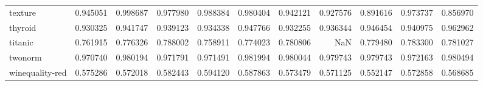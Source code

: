 \begin{tabular}{lrrrrrrrrrr}
texture         &   0.945051 &  0.998687 &  0.977980 &  0.988384 &  0.980404 &  0.942121 &  0.927576 &  0.891616 &  0.973737 &  0.856970 \\
thyroid         &   0.930325 &  0.941747 &  0.939123 &  0.934338 &  0.947766 &  0.932255 &  0.936344 &  0.946454 &  0.940975 &  0.962962 \\
titanic         &   0.761915 &  0.776326 &  0.788002 &  0.758911 &  0.774023 &  0.780806 &       NaN &  0.779480 &  0.783300 &  0.781027 \\
twonorm         &   0.970740 &  0.980194 &  0.971791 &  0.971491 &  0.981994 &  0.980044 &  0.979743 &  0.979743 &  0.972163 &  0.980494 \\
winequality-red &   0.575286 &  0.572018 &  0.582443 &  0.594120 &  0.587863 &  0.573479 &  0.571125 &  0.552147 &  0.572858 &  0.568685 \\
\bottomrule
\end{tabular}
